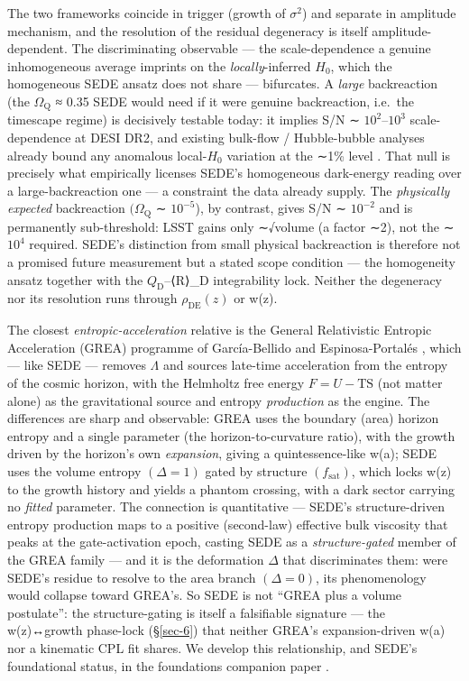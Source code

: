 \documentclass[preprint,12pt]{elsarticle}
\begin{document}
The two frameworks coincide in trigger (growth of \(\sigma ^{2}\)) and
separate in amplitude mechanism, and the resolution of the residual
degeneracy is itself amplitude-dependent. The discriminating observable
--- the scale-dependence a genuine inhomogeneous average imprints on the
\emph{locally}-inferred \(H_{0}\), which the homogeneous SEDE ansatz
does not share --- bifurcates. A \emph{large} backreaction (the
\textbar{}\(\Omega _{\mathrm{Q}}\)\textbar{} ≈ 0.35 SEDE would need if
it were genuine backreaction, i.e.~the timescape regime) is decisively
testable today: it implies S/N ∼ \(10^{2}\)--\(10^{3}\) scale-dependence
at DESI DR2, and existing bulk-flow / Hubble-bubble analyses already
bound any anomalous local-\(H_{0}\) variation at the ∼1\% level
\citep{Kenworthy:2019qwq}. That null is precisely what empirically
licenses SEDE's homogeneous dark-energy reading over a
large-backreaction one --- a constraint the data already supply. The
\emph{physically expected} backreaction \((\Omega _{\mathrm{Q}}\) ∼
\(10^{-5}\)), by contrast, gives S/N ∼ \(10^{-2}\) and is permanently
sub-threshold: LSST gains only ∼√volume (a factor ∼2), not the
∼\(10^{4}\) required. SEDE's distinction from small physical
backreaction is therefore not a promised future measurement but a stated
scope condition --- the homogeneity ansatz together with the
\(Q_{\mathrm{D}}\)--⟨R⟩\_D integrability lock. Neither the degeneracy
nor its resolution runs through \(\rho _\mathrm{DE}(z)\) or w(z).

The closest \emph{entropic-acceleration} relative is the General
Relativistic Entropic Acceleration (GREA) programme of García-Bellido
and Espinosa-Portalés
\citep{Garcia-Bellido:2021idr, Espinosa-Portales:2021cac}, which ---
like SEDE --- removes \(\Lambda\) and sources late-time acceleration
from the entropy of the cosmic horizon, with the Helmholtz free energy
\(F = U - \mathrm{TS}\) (not matter alone) as the gravitational source
and entropy \emph{production} as the engine. The differences are sharp
and observable: GREA uses the boundary (area) horizon entropy and a
single parameter (the horizon-to-curvature ratio), with the growth
driven by the horizon's own \emph{expansion}, giving a quintessence-like
w(a); SEDE uses the volume entropy \((\Delta  = 1)\) gated by structure
\((f_{\mathrm{sat}})\), which locks w(z) to the growth history and
yields a phantom crossing, with a dark sector carrying no \emph{fitted}
parameter. The connection is quantitative --- SEDE's structure-driven
entropy production maps to a positive (second-law) effective bulk
viscosity that peaks at the gate-activation epoch, casting SEDE as a
\emph{structure-gated} member of the GREA family --- and it is the
deformation \(\Delta\) that discriminates them: were SEDE's residue to
resolve to the area branch \((\Delta  = 0)\), its phenomenology would
collapse toward GREA's. So SEDE is not ``GREA plus a volume postulate'':
the structure-gating is itself a falsifiable signature --- the
w(z)↔growth phase-lock (§\ref{sec-6}) that neither GREA's
expansion-driven w(a) nor a kinematic CPL fit shares. We develop this
relationship, and SEDE's foundational status, in the foundations
companion paper \citep{Pandev:2026foundations}.
\end{document}

